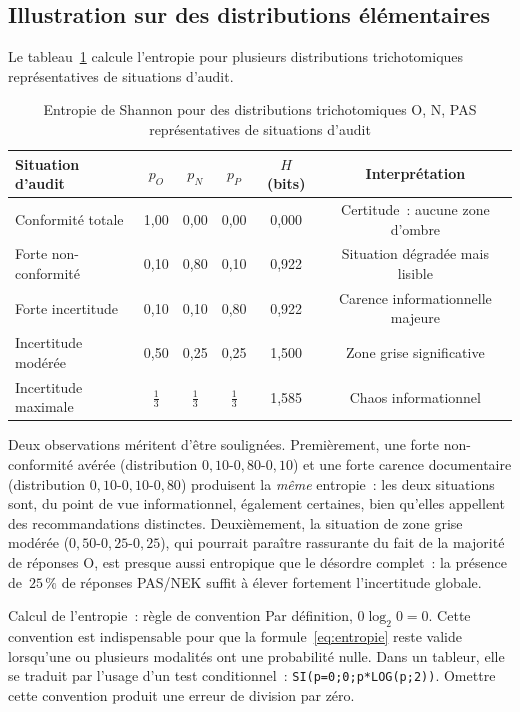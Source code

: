 \subsection{Illustration sur des distributions élémentaires}

Le tableau~\ref{tab:entropies} calcule l'entropie pour plusieurs distributions
trichotomiques représentatives de situations d'audit.

\begin{table}[H]
\centering
\small
\caption{Entropie de Shannon pour des distributions trichotomiques {O, N, PAS}
représentatives de situations d'audit}
\label{tab:entropies}
\begin{tabular}{lccccc}
\toprule
\textbf{Situation d'audit} & $p_O$ & $p_N$ & $p_P$ &
$H$ (bits) & \textbf{Interprétation} \\
\midrule
Conformité totale &
1{,}00 & 0{,}00 & 0{,}00 & 0{,}000 & Certitude~: aucune zone d'ombre \\
\addlinespace
Forte non-conformité &
0{,}10 & 0{,}80 & 0{,}10 & 0{,}922 & Situation dégradée mais lisible \\
\addlinespace
Forte incertitude &
0{,}10 & 0{,}10 & 0{,}80 & 0{,}922 & Carence informationnelle majeure \\
\addlinespace
Incertitude modérée &
0{,}50 & 0{,}25 & 0{,}25 & 1{,}500 & Zone grise significative \\
\addlinespace
Incertitude maximale &
$\frac{1}{3}$ & $\frac{1}{3}$ & $\frac{1}{3}$ & 1{,}585 & Chaos informationnel \\
\bottomrule
\end{tabular}
\end{table}

Deux observations méritent d'être soulignées. Premièrement, une forte
non-conformité avérée (distribution $0{,}10$-$0{,}80$-$0{,}10$) et une forte
carence documentaire (distribution $0{,}10$-$0{,}10$-$0{,}80$) produisent la
\emph{même} entropie~: les deux situations sont, du point de vue informationnel,
également certaines, bien qu'elles appellent des recommandations distinctes.
Deuxièmement, la situation de zone grise modérée ($0{,}50$-$0{,}25$-$0{,}25$),
qui pourrait paraître rassurante du fait de la majorité de réponses O, est
presque aussi entropique que le désordre complet~: la présence de~$25\,\%$ de
réponses PAS/NEK suffit à élever fortement l'incertitude globale.

\begin{boiteRemarque}{Calcul de l'entropie~: règle de convention}
Par définition, $0 \log_2 0 = 0$. Cette convention est indispensable pour que
la formule~\eqref{eq:entropie} reste valide lorsqu'une ou plusieurs modalités
ont une probabilité nulle. Dans un tableur, elle se traduit par l'usage d'un
test conditionnel~: \verb|SI(p=0;0;p*LOG(p;2))|. Omettre cette convention produit
une erreur de division par zéro.
\end{boiteRemarque}

